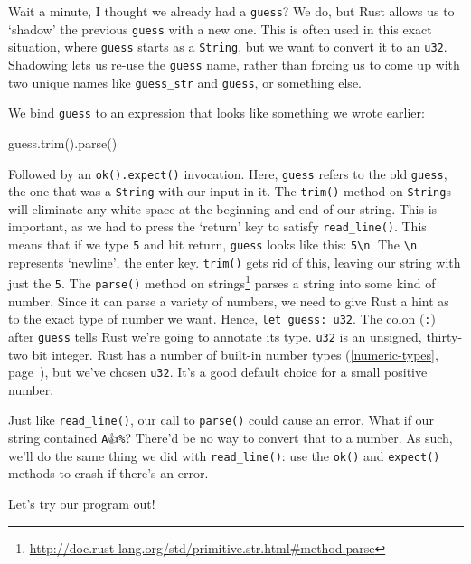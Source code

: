 \documentclass[a4paper,]{book}
\renewcommand*{\hyperref}[2][\ar]{%
  \def\ar{#2}%
  #2 (\autoref{#1}, page~\pageref{#1})}
\newenvironment{Shaded}{\begin{snugshade}}{\end{snugshade}}
\newcommand{\NormalTok}[1]{{#1}}
\renewcommand{\href}[2]{#2\footnote{\url{#1}}}
\begin{document}
Wait a minute, I thought we already had a \texttt{guess}? We do, but
Rust allows us to `shadow' the previous \texttt{guess} with a new one.
This is often used in this exact situation, where \texttt{guess} starts
as a \texttt{String}, but we want to convert it to an \texttt{u32}.
Shadowing lets us re-use the \texttt{guess} name, rather than forcing us
to come up with two unique names like \texttt{guess\_str} and
\texttt{guess}, or something else.

We bind \texttt{guess} to an expression that looks like something we
wrote earlier:

\begin{Shaded}
\begin{Highlighting}[]
\NormalTok{guess.trim().parse()}
\end{Highlighting}
\end{Shaded}

Followed by an \texttt{ok().expect()} invocation. Here, \texttt{guess}
refers to the old \texttt{guess}, the one that was a \texttt{String}
with our input in it. The \texttt{trim()} method on \texttt{String}s
will eliminate any white space at the beginning and end of our string.
This is important, as we had to press the `return' key to satisfy
\texttt{read\_line()}. This means that if we type \texttt{5} and hit
return, \texttt{guess} looks like this: \texttt{5\textbackslash{}n}. The
\texttt{\textbackslash{}n} represents `newline', the enter key.
\texttt{trim()} gets rid of this, leaving our string with just the
\texttt{5}. The
\href{http://doc.rust-lang.org/std/primitive.str.html\#method.parse}{\texttt{parse()}
method on strings} parses a string into some kind of number. Since it
can parse a variety of numbers, we need to give Rust a hint as to the
exact type of number we want. Hence, \texttt{let\ guess:\ u32}. The
colon (\texttt{:}) after \texttt{guess} tells Rust we're going to
annotate its type. \texttt{u32} is an unsigned, thirty-two bit integer.
Rust has \hyperref[numeric-types]{a number of built-in number types},
but we've chosen \texttt{u32}. It's a good default choice for a small
positive number.

Just like \texttt{read\_line()}, our call to \texttt{parse()} could
cause an error. What if our string contained \texttt{A👍\%}? There'd be
no way to convert that to a number. As such, we'll do the same thing we
did with \texttt{read\_line()}: use the \texttt{ok()} and
\texttt{expect()} methods to crash if there's an error.

Let's try our program out!
\end{document}
